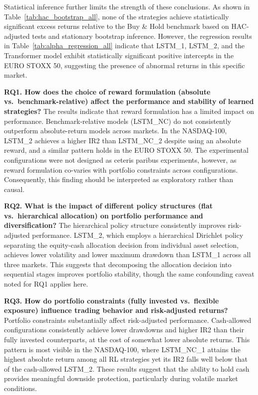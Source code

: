 \documentclass[]{elsarticle}
\begin{document}
Statistical inference further limits the strength of these conclusions. As shown in Table~\ref{tab:hac_bootstrap_all}, none of the strategies achieve statistically significant excess returns relative to the Buy \& Hold benchmark based on HAC-adjusted tests and stationary bootstrap inference. However, the regression results in Table~\ref{tab:alpha_regression_all} indicate that LSTM\_1, LSTM\_2, and the Transformer model exhibit statistically significant positive intercepts in the EURO STOXX 50, suggesting the presence of abnormal returns in this specific market.

\noindent\textbf{RQ1. How does the choice of reward formulation (absolute vs.\ benchmark-relative) affect the performance and stability of learned strategies?}
\newline The results indicate that reward formulation has a limited impact on performance. Benchmark-relative models (LSTM\_NC) do not consistently outperform absolute-return models across markets. In the NASDAQ-100, LSTM\_2 achieves a higher IR2 than LSTM\_NC\_2 despite using an absolute reward, and a similar pattern holds in the EURO STOXX 50. The experimental configurations were not designed as ceteris paribus experiments, however, as reward formulation co-varies with portfolio constraints across configurations. Consequently, this finding should be interpreted as exploratory rather than causal.

\noindent\textbf{RQ2. What is the impact of different policy structures (flat vs.\ hierarchical allocation) on portfolio performance and diversification?}
\newline The hierarchical policy structure consistently improves risk-adjusted performance. LSTM\_2, which employs a hierarchical Dirichlet policy separating the equity-cash allocation decision from individual asset selection, achieves lower volatility and lower maximum drawdown than LSTM\_1 across all three markets. This suggests that decomposing the allocation decision into sequential stages improves portfolio stability, though the same confounding caveat noted for RQ1 applies here.

\noindent\textbf{RQ3. How do portfolio constraints (fully invested vs.\ flexible exposure) influence trading behavior and risk-adjusted returns?}
\newline Portfolio constraints substantially affect risk-adjusted performance. Cash-allowed configurations consistently achieve lower drawdowns and higher IR2 than their fully invested counterparts, at the cost of somewhat lower absolute returns. This pattern is most visible in the NASDAQ-100, where LSTM\_NC\_1 attains the highest absolute return among all RL strategies yet its IR2 falls well below that of the cash-allowed LSTM\_2. These results suggest that the ability to hold cash provides meaningful downside protection, particularly during volatile market conditions.
\end{document}
